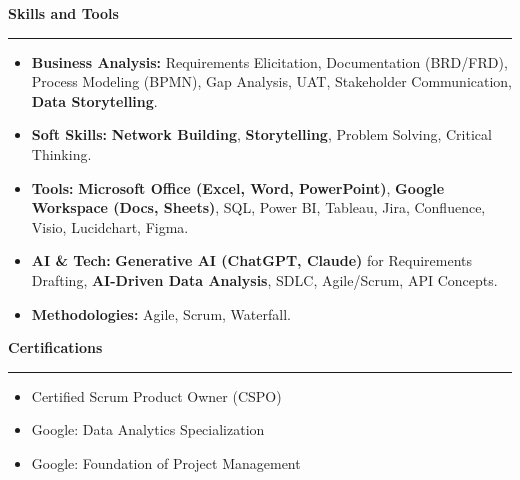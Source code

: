 \documentclass[9pt,letterpaper]{article} %
\newenvironment{rSection}[1]{ %
  \sectionskip
 \textbf{\Large #1} %
  \sectionlineskip
  \hrule %
  \begin{list}{}{ %
    \setlength{\leftmargin}{-0em} %
  }
  \item[]
}{
  \end{list}
}
\def\sectionlineskip{\smallskip} %
\def\sectionskip{} %
\begin{document}
\begin{rSection}{Skills and Tools}
\item[] \vspace{-0.5em}
\begin{itemize}[left=-1.5em, labelsep=.1cm, labelwidth=.2cm, itemsep=0.0em]
    \item \textbf{Business Analysis:} Requirements Elicitation, Documentation (BRD/FRD), Process Modeling (BPMN), Gap Analysis, UAT, Stakeholder Communication, \textbf{Data Storytelling}.
    \item \textbf{Soft Skills:} \textbf{Network Building}, \textbf{Storytelling}, Problem Solving, Critical Thinking.
    \item \textbf{Tools:} \textbf{Microsoft Office (Excel, Word, PowerPoint)}, \textbf{Google Workspace (Docs, Sheets)}, SQL, Power BI, Tableau, Jira, Confluence, Visio, Lucidchart, Figma.
    \item \textbf{AI \& Tech:} \textbf{Generative AI (ChatGPT, Claude)} for Requirements Drafting, \textbf{AI-Driven Data Analysis}, SDLC, Agile/Scrum, API Concepts.
    \item \textbf{Methodologies:}  Agile, Scrum, Waterfall.
\end{itemize}
\end{rSection}

\begin{rSection}{Certifications}
\item[] \vspace{-1em}
\begin{itemize}[left=-1.5em, labelsep=.1cm, labelwidth=.2cm, itemsep=0.0em]
\item Certified Scrum Product Owner (CSPO)
\item Google: Data Analytics Specialization
\item Google: Foundation of Project Management
\end{itemize}
\end{rSection}
\end{document}
